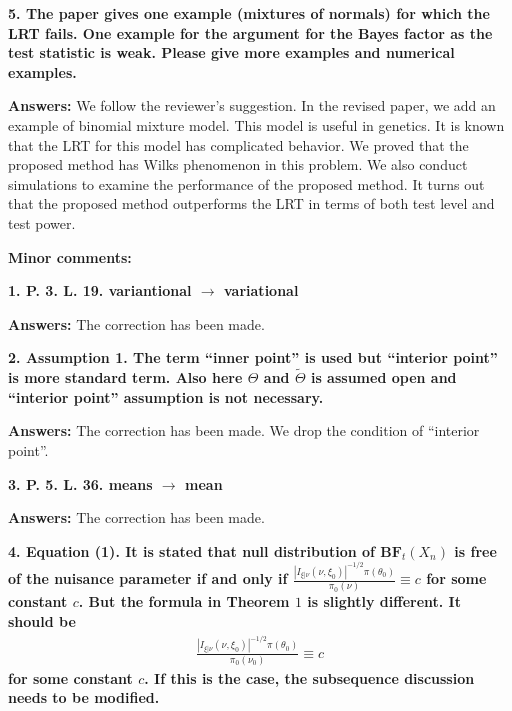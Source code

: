 \documentclass[11pt]{article}
\theoremstyle{plain}
\theoremstyle{definition}
\theoremstyle{remark}
\begin{document}
\textbf{
    5. The paper gives one example (mixtures of normals) for which the LRT fails. One example for the argument for the Bayes factor as the test statistic is weak. Please give more examples and numerical examples.
}

\textbf{Answers:}
We follow the reviewer's suggestion.
In the revised paper, we add an example of binomial mixture model.
This model is useful in genetics.
It is known that the LRT for this model has complicated behavior.
We proved that the proposed method has Wilks phenomenon in this problem.
We also conduct simulations to examine the performance of the proposed method.
It turns out that the proposed method outperforms the LRT in terms of both test level and test power.

\textbf{Minor comments:}

\textbf{
1. 
P. 3. L. 19. variantional $\rightarrow$ variational
}

\textbf{Answers:}
The correction has been made.

\textbf{
2. Assumption 1. The term ``inner point'' is used but ``interior point'' is more standard term.
Also here $\Theta$ and $\tilde \Theta$ is assumed open and ``interior point'' assumption is not necessary.
}

\textbf{Answers:}
The correction has been made.
We drop the condition of ``interior point''.

\textbf{
    3. P. 5. L. 36. means $\rightarrow$ mean
}

\textbf{Answers:}
The correction has been made.



\textbf{
4.
Equation (1).
It is stated that null distribution of $\textbf{BF}_t(X_n)$ is free of the nuisance parameter if and only if $\frac{\left| I_{\xi | \nu} (\nu, \xi_0) \right|^{-1/2} \pi(\theta_0) }{\pi_0(\nu)} \equiv c$ for some constant $c$. But the formula in Theorem $1$ is slightly different.
It should be
\begin{align*}
\frac{\left| I_{\xi | \nu} (\nu, \xi_0) \right|^{-1/2} \pi(\theta_0) }{\pi_0(\nu_0)} \equiv c
\end{align*}
for some constant $c$.
If this is the case, the subsequence discussion needs to be modified.
}
\end{document}
